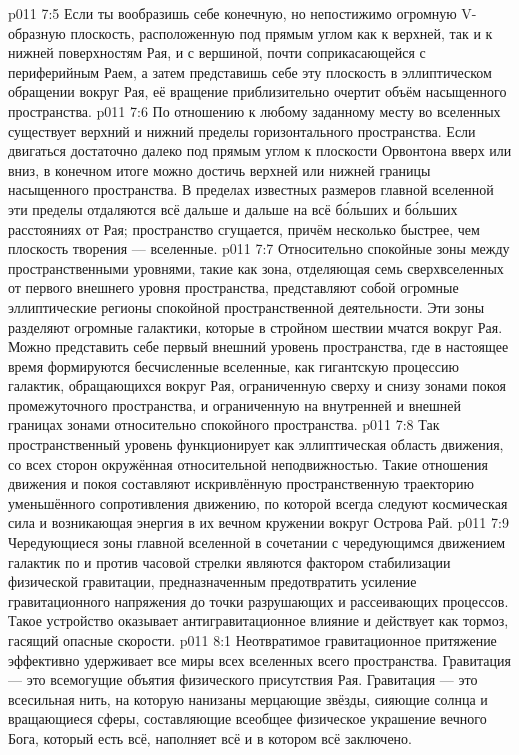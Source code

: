\vs p011 7:5 Если ты вообразишь себе конечную, но непостижимо огромную V\hyp{}образную плоскость, расположенную под прямым углом как к верхней, так и к нижней поверхностям Рая, и с вершиной, почти соприкасающейся с периферийным Раем, а затем представишь себе эту плоскость в эллиптическом обращении вокруг Рая, её вращение приблизительно очертит объём насыщенного пространства.
\vs p011 7:6 По отношению к любому заданному месту во вселенных существует верхний и нижний пределы горизонтального пространства. Если двигаться достаточно далеко под прямым углом к плоскости Орвонтона вверх или вниз, в конечном итоге можно достичь верхней или нижней границы насыщенного пространства. В пределах известных размеров главной вселенной эти пределы отдаляются всё дальше и дальше на всё б\'ольших и б\'ольших расстояниях от Рая; пространство сгущается, причём несколько быстрее, чем плоскость творения --- вселенные.
\vs p011 7:7 \pc Относительно спокойные зоны между пространственными уровнями, такие как зона, отделяющая семь сверхвселенных от первого внешнего уровня пространства, представляют собой огромные эллиптические регионы спокойной пространственной деятельности. Эти зоны разделяют огромные галактики, которые в стройном шествии мчатся вокруг Рая. Можно представить себе первый внешний уровень пространства, где в настоящее время формируются бесчисленные вселенные, как гигантскую процессию галактик, обращающихся вокруг Рая, ограниченную сверху и снизу зонами покоя промежуточного пространства, и ограниченную на внутренней и внешней границах зонами относительно спокойного пространства.
\vs p011 7:8 Так пространственный уровень функционирует как эллиптическая область движения, со всех сторон окружённая относительной неподвижностью. Такие отношения движения и покоя составляют искривлённую пространственную траекторию уменьшённого сопротивления движению, по которой всегда следуют космическая сила и возникающая энергия в их вечном кружении вокруг Острова Рай.
\vs p011 7:9 Чередующиеся зоны главной вселенной в сочетании с чередующимся движением галактик по и против часовой стрелки являются фактором стабилизации физической гравитации, предназначенным предотвратить усиление гравитационного напряжения до точки разрушающих и рассеивающих процессов. Такое устройство оказывает антигравитационное влияние и действует как тормоз, гасящий опасные скорости.
\vs p011 8:1 Неотвратимое гравитационное притяжение эффективно удерживает все миры всех вселенных всего пространства. Гравитация --- это всемогущие объятия физического присутствия Рая. Гравитация --- это всесильная нить, на которую нанизаны мерцающие звёзды, сияющие солнца и вращающиеся сферы, составляющие всеобщее физическое украшение вечного Бога, который есть всё, наполняет всё и в котором всё заключено.
